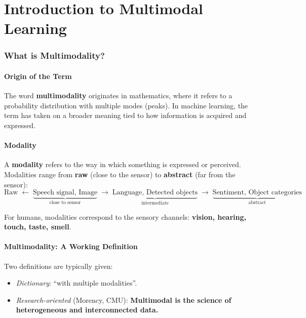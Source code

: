 \documentclass[11pt,a4paper]{article}
\theoremstyle{definition}
\theoremstyle{plain}
\theoremstyle{remark}
\begin{document}
\part{Introduction to Multimodal Learning}

\section{What is Multimodality?}

\subsection{Origin of the Term}

The word \textbf{multimodality} originates in mathematics, where it refers to a probability distribution with multiple modes (peaks). In machine learning, the term has taken on a broader meaning tied to how information is acquired and expressed.

\subsection{Modality}

A \textbf{modality} refers to the way in which something is expressed or perceived. Modalities range from \textbf{raw} (close to the sensor) to \textbf{abstract} (far from the sensor):
\[
    \text{Raw} \;\longleftarrow\; \underbrace{\text{Speech signal, Image}}_{\text{close to sensor}} \;\longrightarrow\; \underbrace{\text{Language, Detected objects}}_{\text{intermediate}} \;\longrightarrow\; \underbrace{\text{Sentiment, Object categories}}_{\text{abstract}}
\]

For humans, modalities correspond to the sensory channels: \textbf{vision, hearing, touch, taste, smell}.

\subsection{Multimodality: A Working Definition}

Two definitions are typically given:
\begin{itemize}
    \item \emph{Dictionary}: ``with multiple modalities''.
    \item \emph{Research-oriented} (Morency, CMU): \textbf{Multimodal is the science of heterogeneous and interconnected data.}
\end{itemize}
\end{document}
